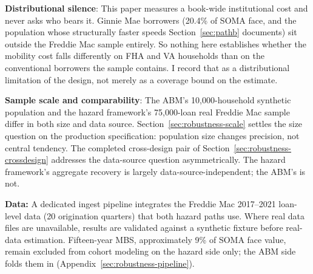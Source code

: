 \documentclass[12pt]{article}
\begin{document}
\textbf{Distributional silence}: This paper measures a book-wide institutional cost and never asks who bears it. Ginnie Mae borrowers (20.4\% of SOMA face, and the population whose structurally faster speeds Section~\ref{sec:pathb} documents) sit outside the Freddie Mac sample entirely. So nothing here establishes whether the mobility cost falls differently on FHA and VA households than on the conventional borrowers the sample contains. I record that as a distributional limitation of the design, not merely as a coverage bound on the estimate.

\textbf{Sample scale and comparability}: The ABM's 10,000-household synthetic population and the hazard framework's 75,000-loan real Freddie Mac sample differ in both size and data source. Section~\ref{sec:robustness-scale} settles the size question on the production specification: population size changes precision, not central tendency. The completed cross-design pair of Section~\ref{sec:robustness-crossdesign} addresses the data-source question asymmetrically. The hazard framework's aggregate recovery is largely data-source-independent; the ABM's is not.

\textbf{Data:} A dedicated ingest pipeline integrates the Freddie Mac 2017--2021 loan-level data (20 origination quarters) that both hazard paths use. Where real data files are unavailable, results are validated against a synthetic fixture before real-data estimation. Fifteen-year MBS, approximately 9\% of SOMA face value, remain excluded from cohort modeling on the hazard side only; the ABM side folds them in (Appendix~\ref{sec:robustness-pipeline}).
\end{document}
